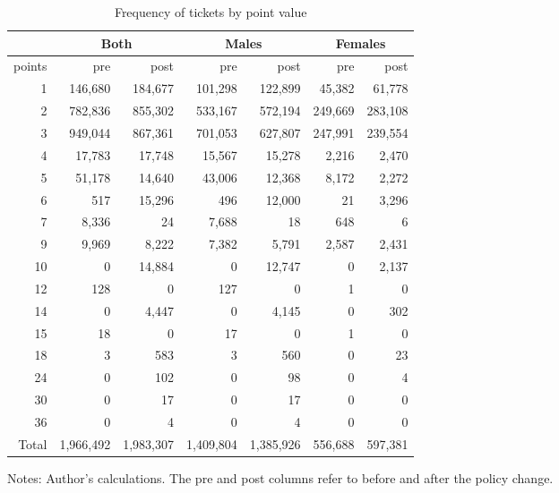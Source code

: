 
\begin{table}%
\centering
\begin{tabular}{r r r r r r r}
  \hline
		& \multicolumn{2}{c}{Both} 	&  \multicolumn{2}{c}{Males} &  \multicolumn{2}{c}{Females} \\
  \hline
points 	& pre 			& post			& pre 			& post			& pre 			& post		\\ 
  \hline

1		& 146,680		& 184,677		& 101,298		& 122,899		& 45,382		& 61,778    \\
2		& 782,836		& 855,302		& 533,167		& 572,194		& 249,669		& 283,108    \\
3		& 949,044		& 867,361		& 701,053		& 627,807		& 247,991		& 239,554    \\
4		& 17,783		& 17,748		& 15,567		& 15,278		& 2,216		& 2,470    \\
5		& 51,178		& 14,640		& 43,006		& 12,368		& 8,172		& 2,272    \\
6		& 517			& 15,296		& 496			& 12,000		& 21			& 3,296    \\
7		& 8,336		& 24			& 7,688		& 18			& 648			& 6    \\
9		& 9,969		& 8,222		& 7,382		& 5,791		& 2,587		& 2,431    \\
10		& 0				& 14,884		& 0				& 12,747		& 0				& 2,137    \\
12		& 128			& 0				& 127			& 0				& 1				& 0    \\
14		& 0				& 4,447		& 0				& 4,145		& 0				& 302    \\
15		& 18			& 0				& 17			& 0				& 1				& 0    \\
18		& 3				& 583			& 3				& 560			& 0				& 23    \\
24		& 0				& 102			& 0				& 98			& 0				& 4    \\
30		& 0				& 17			& 0				& 17			& 0				& 0    \\
36		& 0				& 4				& 0				& 4				& 0				& 0    \\

   \hline
Total 	& 1,966,492 	& 1,983,307 	& 1,409,804 	& 1,385,926 	& 556,688 		& 597,381 \\ 
   \hline
\end{tabular}
\caption{Frequency of tickets by point value} 
Notes: Author’s calculations. The pre and post columns refer to before and after the policy change.
\label{tab:penalties}
\end{table}